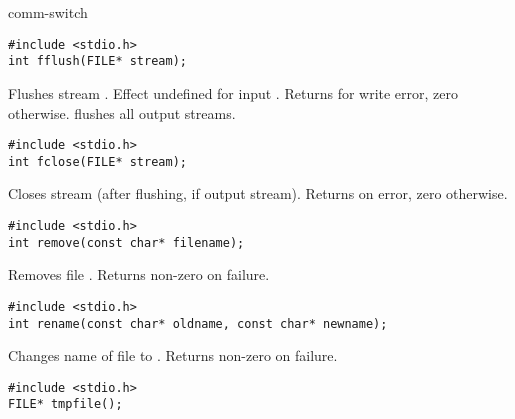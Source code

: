 \begin{Ventry2}{comm-switch  }
\begin{production}
\begin{verbatim}
#include <stdio.h>
int fflush(FILE* stream);
\end{verbatim}
\end{production}

     Flushes stream . Effect undefined for input
     . Returns  for write error, zero
     otherwise.  flushes all output streams.

\item[fclose]
\label{item:fclose}
\begin{production}
\begin{verbatim}
#include <stdio.h>
int fclose(FILE* stream);
\end{verbatim}
\end{production}

     Closes stream  (after flushing, if output stream). Returns  on
     error, zero otherwise.

\item[remove]
\label{item:remove}
\begin{production}
\begin{verbatim}
#include <stdio.h>
int remove(const char* filename);
\end{verbatim}
\end{production}

     Removes file . Returns non-zero on failure.

\item[rename]
\label{item:rename}
\begin{production}
\begin{verbatim}
#include <stdio.h>
int rename(const char* oldname, const char* newname);
\end{verbatim}
\end{production}

     Changes name of file  to . Returns non-zero on failure.

\item[tmpfile]
\label{item:tmpfile}
\begin{production}
\begin{verbatim}
#include <stdio.h>
FILE* tmpfile();
\end{verbatim}
\end{production}


\end{Ventry2}
